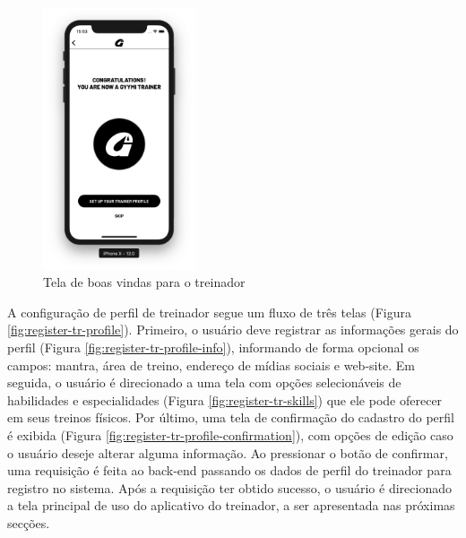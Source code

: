 \begin{figure}[H]
    \centering
    \includegraphics[width=0.4\textwidth]{pfc/figuras/tr-congratulations.png}
    \caption{Tela de boas vindas para o treinador}
    \label{fig:tr-welcome}
\end{figure}

A configuração de perfil de treinador segue um fluxo de três telas (Figura \ref{fig:register-tr-profile}). Primeiro, o usuário deve registrar as informações gerais do perfil (Figura \ref{fig:register-tr-profile-info}), informando de forma opcional os campos: mantra, área de treino, endereço de mídias sociais e web-site. Em seguida, o usuário é direcionado a uma tela com opções selecionáveis de habilidades e especialidades (Figura \ref{fig:register-tr-skills}) que ele pode oferecer em seus treinos físicos. Por último, uma tela de confirmação do cadastro do perfil é exibida (Figura \ref{fig:register-tr-profile-confirmation}), com opções de edição caso o usuário deseje alterar alguma informação. Ao pressionar o botão de confirmar, uma requisição é feita ao back-end passando os dados de perfil do treinador para registro no sistema. Após a requisição ter obtido sucesso, o usuário é direcionado a tela principal de uso do aplicativo do treinador, a ser apresentada nas próximas secções.

